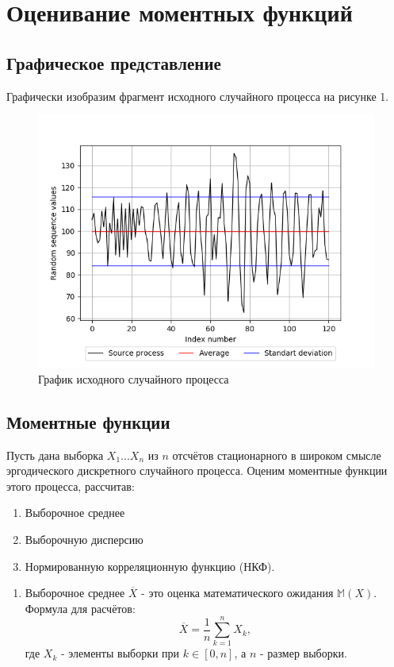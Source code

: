 \documentclass[12pt, fleqn]{article}
\begin{document}
\section{Оценивание моментных функций}
{
	\subsection{Графическое представление}
	Графически изобразим фрагмент исходного случайного процесса на рисунке 1.
	\begin{figure}[H]
		\includegraphics{plot1.png}
		\caption{График исходного случайного процесса}
	\end{figure}
						    
	\subsection{Моментные функции}
	Пусть дана выборка $X_{1} ... X_{n}$ из $n$ отсчётов стационарного в широком смысле эргодического дискретного случайного процесса. Оценим моментные функции этого процесса, рассчитав:
	\begin{enumerate}
		\item Выборочное среднее
		\item Выборочную дисперсию
		\item Нормированную корреляционную функцию (НКФ).
	\end{enumerate}
						      
	\begin{enumerate}
		\item {
			Выборочное среднее $\overline{X}$ - это оценка математического ожидания $\mathbb{M}(X)$. Формула для расчётов:
			\begin{equation}
				\overline{X}=\frac{1}{n}\sum_{k=1}^{n} X_k,
			\end{equation}
			где $X_k$ - элементы выборки при $k \in [0, n]$, а $n$ - размер выборки.        
																		        
}
\end{enumerate}}
\end{document}
